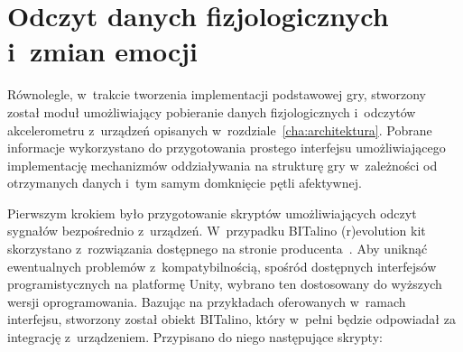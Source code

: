 \section{Odczyt danych fizjologicznych i~zmian emocji}
Równolegle, w~trakcie tworzenia implementacji podstawowej gry, stworzony został moduł umożliwiający pobieranie danych fizjologicznych i~odczytów akcelerometru z~urządzeń opisanych w~rozdziale~\ref{cha:architektura}. Pobrane informacje wykorzystano do przygotowania prostego interfejsu umożliwiającego implementację mechanizmów oddziaływania na strukturę gry w~zależności od otrzymanych danych i~tym samym domknięcie pętli afektywnej.

Pierwszym krokiem było przygotowanie skryptów umożliwiających odczyt sygnałów bezpośrednio z~urządzeń. W~przypadku BITalino (r)evolution kit skorzystano z~rozwiązania dostępnego na stronie producenta~\cite{bitalino_apis}. Aby uniknąć ewentualnych problemów z~kompatybilnością, spośród dostępnych interfejsów programistycznych na platformę Unity, wybrano ten dostosowany do wyższych wersji oprogramowania. Bazując na przykładach oferowanych w~ramach interfejsu, stworzony został obiekt BITalino, który w~pełni będzie odpowiadał za integrację z~urządzeniem. Przypisano do niego następujące skrypty:
